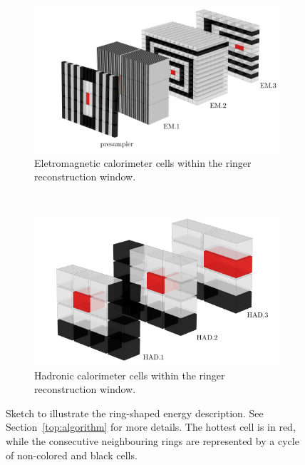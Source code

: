 \begin{figure}[h!t]
	\centering
	\begin{center}
		\begin{subfigure}[c]{0.8\textwidth}
			\centering
			\includegraphics[width=\textwidth]{sections/ringer/figures/ATLAS_EM_Layers_v5.pdf}
			\caption{Eletromagnetic calorimeter cells within the ringer reconstruction window.}
		\end{subfigure} \\
		\begin{subfigure}[c]{0.8\textwidth}
			\centering
			\includegraphics[width=\textwidth]{sections/ringer/figures/ATLAS_HAD_Layers_v5.pdf}
			\caption{Hadronic calorimeter cells within the ringer reconstruction window.}
		\end{subfigure}
	\end{center}
	\caption{\label{fig:calo_rings}
		Sketch to illustrate the ring-shaped energy description. See
		Section~\ref{top:algorithm} for more details. 
		The hottest cell is in red, while the consecutive neighbouring rings are represented by a cycle 
		of non-colored and black cells.
	}
\end{figure}













